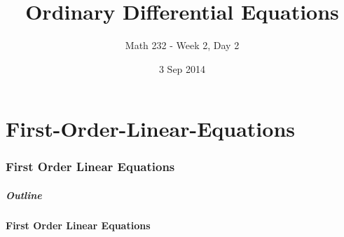 \part{First-Order-Linear-Equations}
\section{First Order Linear Equations}

\title{Ordinary Differential Equations}
\subtitle{Math 232 - Week 2, Day 2}
\date{3 Sep 2014}

\begin{frame}
  \titlepage
\end{frame}

\begin{frame}
  \frametitle{Outline}
  \tableofcontents[ currentsection ]
\end{frame}


\subsection{First Order Linear Equations}

